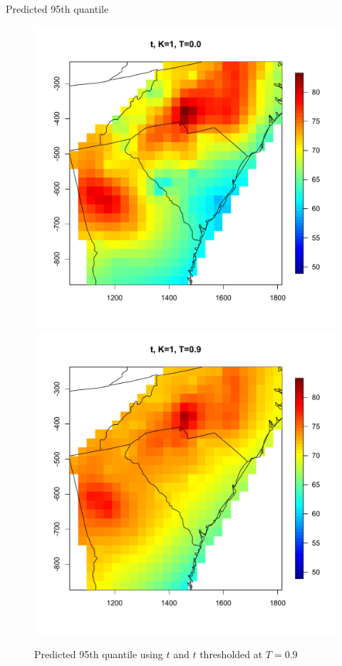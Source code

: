 \documentclass{beamer}
\begin{document}
\begin{frame}{Predicted 95th quantile}
\centering
\begin{figure}
    \includegraphics[width=.5\linewidth]{./plots/quantile-95-t10.pdf}
    \includegraphics[width=.5\linewidth]{./plots/quantile-95-t19.pdf}
    \caption{Predicted 95th quantile using $t$ and $t$ thresholded at $T=0.9$}
\end{figure}
\end{frame}
\end{document}
